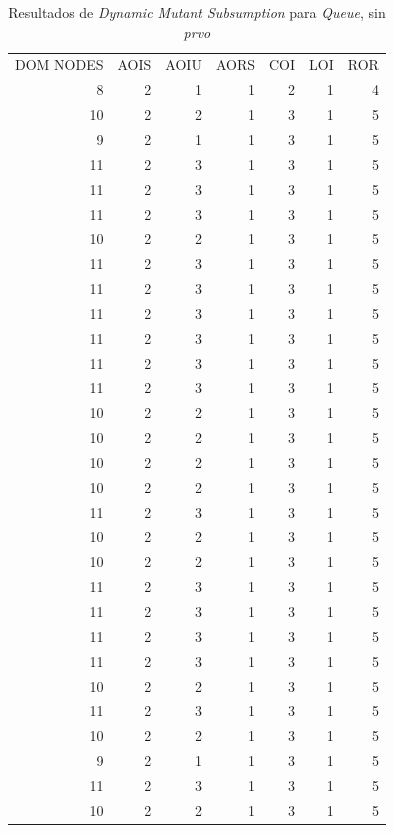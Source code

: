 \begin{table}[]
	\caption{Resultados de \emph{Dynamic Mutant Subsumption} para \emph{Queue}, sin \emph{prvo}}
	\label{tables.results.subsumption.queue.noprvo}
	\centering
	\scriptsize
	\def\arraystretch{0.95}
	\setlength\tabcolsep{0.5mm}
	\begin{tabular}{rrrrrrr}
		DOM NODES & AOIS & AOIU & AORS & COI & LOI & ROR \\
		8 & 2 & 1 & 1 & 2 & 1 & 4 \\
		10 & 2 & 2 & 1 & 3 & 1 & 5 \\
		9 & 2 & 1 & 1 & 3 & 1 & 5 \\
		11 & 2 & 3 & 1 & 3 & 1 & 5 \\
		11 & 2 & 3 & 1 & 3 & 1 & 5 \\
		11 & 2 & 3 & 1 & 3 & 1 & 5 \\
		10 & 2 & 2 & 1 & 3 & 1 & 5 \\
		11 & 2 & 3 & 1 & 3 & 1 & 5 \\
		11 & 2 & 3 & 1 & 3 & 1 & 5 \\
		11 & 2 & 3 & 1 & 3 & 1 & 5 \\
		11 & 2 & 3 & 1 & 3 & 1 & 5 \\
		11 & 2 & 3 & 1 & 3 & 1 & 5 \\
		11 & 2 & 3 & 1 & 3 & 1 & 5 \\
		10 & 2 & 2 & 1 & 3 & 1 & 5 \\
		10 & 2 & 2 & 1 & 3 & 1 & 5 \\
		10 & 2 & 2 & 1 & 3 & 1 & 5 \\
		10 & 2 & 2 & 1 & 3 & 1 & 5 \\
		11 & 2 & 3 & 1 & 3 & 1 & 5 \\
		10 & 2 & 2 & 1 & 3 & 1 & 5 \\
		10 & 2 & 2 & 1 & 3 & 1 & 5 \\
		11 & 2 & 3 & 1 & 3 & 1 & 5 \\
		11 & 2 & 3 & 1 & 3 & 1 & 5 \\
		11 & 2 & 3 & 1 & 3 & 1 & 5 \\
		11 & 2 & 3 & 1 & 3 & 1 & 5 \\
		10 & 2 & 2 & 1 & 3 & 1 & 5 \\
		11 & 2 & 3 & 1 & 3 & 1 & 5 \\
		10 & 2 & 2 & 1 & 3 & 1 & 5 \\
		9 & 2 & 1 & 1 & 3 & 1 & 5 \\
		11 & 2 & 3 & 1 & 3 & 1 & 5 \\
		10 & 2 & 2 & 1 & 3 & 1 & 5
	\end{tabular}
\end{table}

